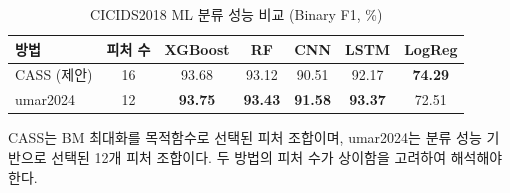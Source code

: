 
\begin{table}[htbp]
\centering
\caption{CICIDS2018 ML 분류 성능 비교 (Binary F1, \%)}
\label{tab:ml_comparison}
\begin{tabular}{lcccccc}
\toprule
방법 & 피처 수 & XGBoost & RF & CNN & LSTM & LogReg \\
\midrule
CASS (제안) & 16 & 93.68 & 93.12 & 90.51 & 92.17 & \textbf{74.29} \\
umar2024~\cite{umar2024} & 12 & \textbf{93.75} & \textbf{93.43} & \textbf{91.58} & \textbf{93.37} & 72.51 \\
\bottomrule
\end{tabular}
\begin{tablenotes}
  \small
  \item CASS는 BM 최대화를 목적함수로 선택된 피처 조합이며,
        umar2024는 분류 성능 기반으로 선택된 12개 피처 조합이다.
        두 방법의 피처 수가 상이함을 고려하여 해석해야 한다.
\end{tablenotes}
\end{table}

